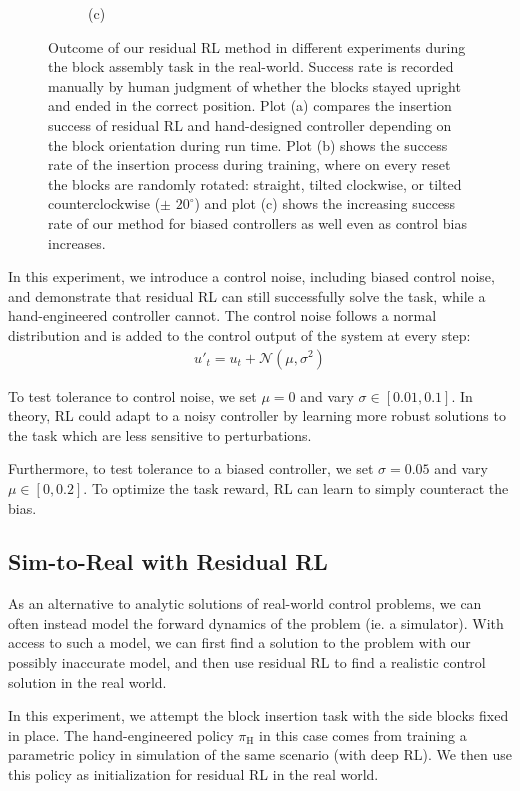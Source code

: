 \begin{figure}[ht!]
\begin{subfigure}[b]{0.3\linewidth}
        \centering
        (c)
    \end{subfigure}
    \vspace{0cm}
    \caption{Outcome of our residual RL method in different experiments during the block assembly task in the real-world. Success rate is recorded manually by human judgment of whether the blocks stayed upright and ended in the correct position. Plot (a) compares the insertion success of residual RL and hand-designed controller depending on the block orientation during run time. Plot (b) shows the success rate of the insertion process during training, where on every reset the blocks are randomly rotated: straight, tilted clockwise, or tilted counterclockwise ($\pm$  $20^{\circ}$) and plot (c) shows the increasing success rate of our method for biased controllers as well even as control bias increases.}%
    \label{fig:environment_variation}
\end{figure}

In this experiment, we introduce a control noise, including biased control noise, and demonstrate that residual RL can still successfully solve the task, while a hand-engineered controller cannot. The control noise follows a normal distribution and is added to the control output of the system at every step:
\begin{align}
    u'_t = u_t + \mathcal{N}(\mu, \sigma^2)
\end{align}

To test tolerance to control noise, we set $\mu = 0$ and vary $\sigma \in [0.01, 0.1]$. In theory, RL could adapt to a noisy controller by learning more robust solutions to the task which are less sensitive to perturbations.

Furthermore, to test tolerance to a biased controller, we set $\sigma = 0.05$ and vary $\mu \in [0, 0.2]$. To optimize the task reward, RL can learn to simply counteract the bias. 

\subsection{Sim-to-Real with Residual RL}

As an alternative to analytic solutions of real-world control problems, we can often instead model the forward dynamics of the problem (ie. a simulator). With access to such a model, we can first find a solution to the problem with our possibly inaccurate model, and then use residual RL to find a realistic control solution in the real world.

In this experiment, we attempt the block insertion task with the side blocks fixed in place. The hand-engineered policy $\pi_\text{H}$ in this case comes from training a parametric policy in simulation of the same scenario (with deep RL). We then use this policy as initialization for residual RL in the real world.